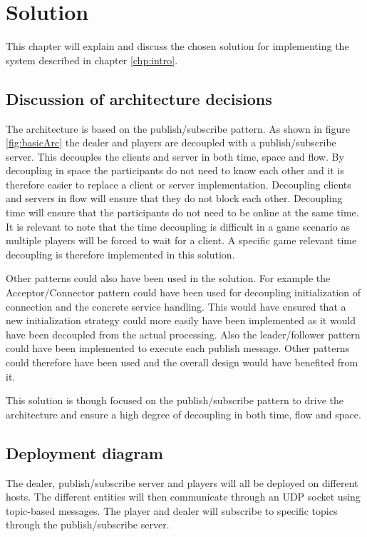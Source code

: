 \chapter{Solution}
This chapter will explain and discuss the chosen solution for implementing the system described in chapter \ref{chp:intro}.

\section{Discussion of architecture decisions}
The architecture is based on the publish/subscribe pattern. As shown in figure \ref{fig:basicArc} the dealer and players are decoupled with a publish/subscribe server. This decouples the clients and server in both time, space and flow. By decoupling in space the participants do not need to know each other and it is therefore easier to replace a client or server implementation. Decoupling clients and servers in flow will ensure that they do not block each other. Decoupling time will ensure that the participants do not need to be online at the same time. It is relevant to note that the time decoupling is difficult in a game scenario as multiple players will be forced to wait for a client. A specific game relevant time decoupling is therefore implemented in this solution.

Other patterns could also have been used in the solution. For example the Acceptor/Connector pattern could have been used for decoupling initialization of connection and the concrete service handling. This would have ensured that a new initialization strategy could more easily have been implemented as it would have been decoupled from the actual processing. Also the leader/follower pattern could have been implemented to execute each publish message. Other patterns could therefore have been used and the overall design would have benefited from it.

This solution is though focused on the publish/subscribe pattern to drive the architecture and ensure a high degree of decoupling in both time, flow and space. 

\section{Deployment diagram}
The dealer, publish/subscribe server and players will all be deployed on different hosts. The different entities will then communicate through an UDP socket using topic-based messages. The player and dealer will subscribe to specific topics through the publish/subscribe server.

